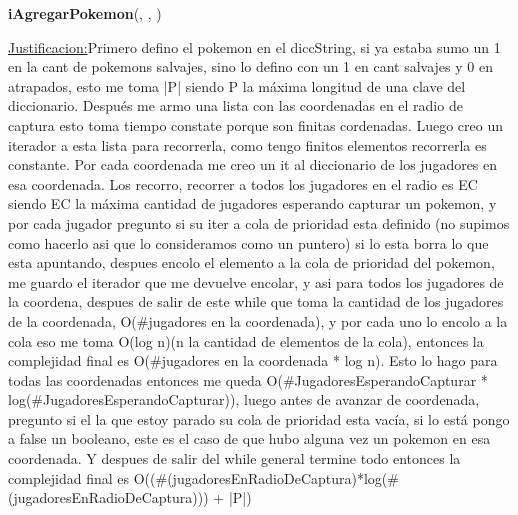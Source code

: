 \begin{Algoritmos}
\begin{algorithm}[H]{\textbf{iAgregarPokemon}(, , )}
\begin{algorithmic}[1]
		\Statex \underline{Justificacion:}Primero defino el pokemon en el diccString, si ya estaba sumo un 1 en la cant de pokemons salvajes, sino lo defino con un 1 en cant salvajes y 0 en atrapados, esto me toma |P| siendo P la máxima longitud de una clave del diccionario. Después me armo una lista con las coordenadas en el radio de captura esto toma tiempo constate porque son finitas cordenadas. Luego creo un iterador a esta lista para recorrerla, como tengo finitos elementos recorrerla es constante. Por cada coordenada me creo un it al diccionario de los jugadores en esa coordenada. Los recorro, recorrer a todos los jugadores en el radio es EC siendo EC la máxima cantidad de jugadores esperando capturar un pokemon, y por cada jugador pregunto si su iter a cola de prioridad esta definido (no supimos como hacerlo asi que lo consideramos como un puntero) si lo esta borra lo que esta apuntando, despues encolo el elemento a la cola de prioridad del pokemon, me guardo el iterador que me devuelve encolar, y asi para todos los jugadores de la coordena, despues de salir de este while que toma la cantidad de los jugadores de la coordenada, O($\#$jugadores en la coordenada), y por cada uno lo encolo a la cola eso me toma O(log n)(n la cantidad de elementos de la cola), entonces la complejidad final es O($\#$jugadores en la coordenada * log n). Esto lo hago para todas las coordenadas entonces me queda O($\#$JugadoresEsperandoCapturar * log($\#$JugadoresEsperandoCapturar)), luego antes de avanzar de coordenada, pregunto si el la que estoy parado su cola de prioridad esta vacía, si lo está pongo a false un booleano, este es el caso de que hubo alguna vez un pokemon en esa coordenada. Y despues de salir del while general termine todo entonces la complejidad final es O(($\#$(jugadoresEnRadioDeCaptura)*log($\#$(jugadoresEnRadioDeCaptura))) + |P|) 
	\end{algorithmic}
\end{algorithm}


\end{Algoritmos}
